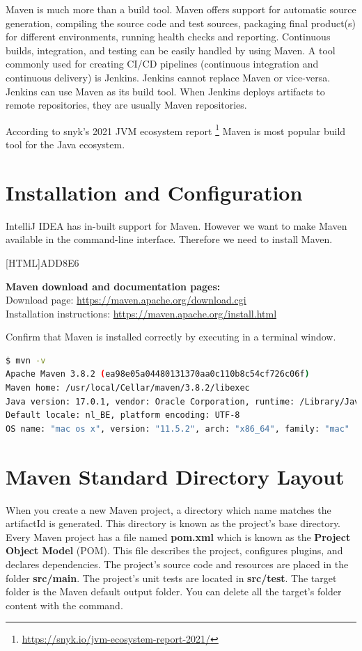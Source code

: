 Maven is much more than a build tool.  Maven offers support for automatic source generation,  compiling the source code and test sources, packaging final product(s) for different environments, running health checks and reporting.  Continuous builds, integration, and testing can be easily handled by using Maven. A tool commonly used for creating CI/CD pipelines (continuous integration and continuous delivery) is Jenkins.  Jenkins cannot replace Maven or vice-versa. Jenkins can use Maven as its build tool.  
When Jenkins deploys artifacts to remote repositories, they are usually Maven repositories. 

According to snyk's 2021 JVM ecosystem report \footnote{\url{https://snyk.io/jvm-ecosystem-report-2021/}} Maven is most popular build tool for the Java ecosystem.

\section{Installation and Configuration}

IntelliJ IDEA has in-built support for Maven.  However we want to make Maven available in the command-line interface. Therefore we need to install Maven. 

 [HTML]{ADD8E6}{\parbox{\textwidth}{%
\noindent \textbf{Maven download and documentation pages:}\\
Download page: \url{https://maven.apache.org/download.cgi}\\
Installation instructions: \url{https://maven.apache.org/install.html}
}}

Confirm that Maven is installed correctly by executing  in a terminal window. 

\begin{lstlisting}[language=bash, frame=single]
$ mvn -v
Apache Maven 3.8.2 (ea98e05a04480131370aa0c110b8c54cf726c06f)
Maven home: /usr/local/Cellar/maven/3.8.2/libexec
Java version: 17.0.1, vendor: Oracle Corporation, runtime: /Library/Java/JavaVirtualMachines/jdk-17.0.1.jdk/Contents/Home
Default locale: nl_BE, platform encoding: UTF-8
OS name: "mac os x", version: "11.5.2", arch: "x86_64", family: "mac"
\end{lstlisting}


\section{Maven Standard Directory Layout}

When you create a new Maven project, a directory which name matches the artifactId is generated. This directory is known as the project’s base directory. 
Every Maven project has a file named \textbf{pom.xml} which is known as the \textbf{Project Object Model} (POM). This file describes the project, configures plugins, and declares dependencies.
The project’s source code and resources are placed in the folder \textbf{src/main}.
The project’s unit tests are located in \textbf{src/test}.
The target folder is the Maven default output folder. You can delete all the target's folder content with the  command.


